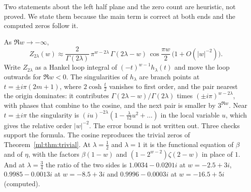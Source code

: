 Two statements about the left half plane and the zero count are heuristic, not proved. We state them because the main term is correct at both ends and the computed zeros follow it.
\begin{remark}\label{ml:rem:left}
As $\Re w\to-\infty$,
\[
Z_{2\lambda}(w)\approx\frac{2}{\Gamma(2\lambda)}\,\pi^{w-2\lambda}\,\Gamma(2\lambda-w)\,\cos\frac{\pi w}{2}\,\big(1+O(|w|^{-2})\big).
\]
Write $Z_{2\lambda}$ as a Hankel loop integral of $(-t)^{w-1}h_\lambda(t)$ and move the loop outwards for $\Re w<0$. The singularities of $h_\lambda$ are branch points at $t=\pm i\pi(2m+1)$, where $2\cosh\frac t2$ vanishes to first order, and the pair nearest the origin dominates: it contributes $\Gamma(2\lambda-w)/\Gamma(2\lambda)$ times $(\pm i\pi)^{w-2\lambda}$, with phases that combine to the cosine, and the next pair is smaller by $3^{\Re w}$. Near $t=\pm i\pi$ the singularity is $(iu)^{-2\lambda}(1-\frac\lambda{12}u^2+\dots)$ in the local variable $u$, which gives the relative order $|w|^{-2}$. The error bound is not written out. Three checks support the formula. The cosine reproduces the trivial zeros of Theorem~\ref{ml:thm:trivial}. At $\lambda=\frac12$ and $\lambda=1$ it is the functional equation of $\beta$ and of $\eta$, with the factors $\beta(1-w)$ and $(1-2^{w-2})\zeta(2-w)$ in place of $1$. And at $\lambda=\frac34$ the ratio of the two sides is $1.0034-0.0201i$ at $w=-2.5+3i$, $0.9985-0.0013i$ at $w=-8.5+3i$ and $0.9996-0.0003i$ at $w=-16.5+5i$ (computed).
\end{remark}


